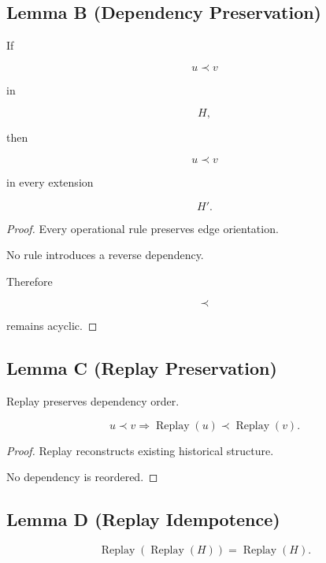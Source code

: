 \documentclass[12pt,oneside]{article}
\theoremstyle{definition}
\theoremstyle{remark}
\begin{document}
\subsection*{Lemma B (Dependency Preservation)}

If

\[
u
\prec
v
\]

in

\[
H,
\]

then

\[
u
\prec
v
\]

in every extension

\[
H'.
\]

\begin{proof}

Every operational rule preserves edge orientation.

No rule introduces a reverse dependency.

Therefore

\[
\prec
\]

remains acyclic.

\end{proof}

\subsection*{Lemma C (Replay Preservation)}

Replay preserves dependency order.

\[
u
\prec
v
\Longrightarrow
\operatorname{Replay}(u)
\prec
\operatorname{Replay}(v).
\]

\begin{proof}

Replay reconstructs existing historical structure.

No dependency is reordered.

\end{proof}

\subsection*{Lemma D (Replay Idempotence)}

\[
\operatorname{Replay}
(
\operatorname{Replay}(H)
)
=
\operatorname{Replay}(H).
\]
\end{document}

